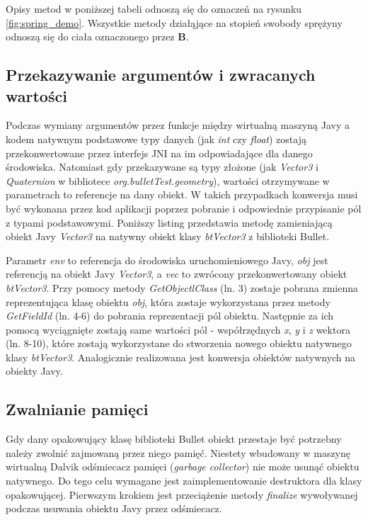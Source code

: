 Opisy metod w poniższej tabeli odnoszą się do oznaczeń na rysunku
\ref{fig:spring_demo}. Wszystkie metody działąjące na stopień swobody sprężyny
odnoszą się do ciała oznaczonego przez \textbf{B}.\\


\subsection{Przekazywanie argumentów i zwracanych wartości}
Podczas wymiany argumentów przez funkcje między wirtualną maszyną Javy a kodem
natywnym podstawowe typy danych (jak \emph{int} czy \emph{float}) zostają
przekonwertowane przez interfejs JNI na im odpowiadające dla danego środowiska.
Natomiast gdy przekazywane są typy złożone (jak \emph{Vector3} i
\emph{Quaternion} w bibliotece \emph{org.bulletTest.geometry}), wartości
otrzymywane w parametrach to referencje na dany obiekt. W takich przypadkach
konwersja musi być wykonana przez kod aplikacji poprzez pobranie i odpowiednie
przypisanie pól z typami podstawowymi. Poniższy listing przedstawia metodę
zamieniającą obiekt Javy \emph{Vector3} na natywny obiekt klasy \emph{btVector3}
z biblioteki Bullet.



Parametr \emph{env} to referencja do środowiska uruchomieniowego Javy,
\emph{obj} jest referencją na obiekt Javy \emph{Vector3}, a \emph{vec} to
zwrócony przekonwertowany obiekt \emph{btVector3}. Przy pomocy metody
\emph{GetObjectlClass} (ln. 3) zostaje pobrana zmienna reprezentująca klasę
obiektu \emph{obj}, która zostaje wykorzystana przez metody
\emph{GetFieldId} (ln. 4-6) do pobrania reprezentacji pól obiektu. Następnie za
ich pomocą wyciągnięte zostają same wartości pól - współrzędnych \emph{x},
\emph{y} i \emph{z} wektora (ln. 8-10), które zostają wykorzystane do stworzenia
nowego obiektu natywnego klasy \emph{btVector3}. Analogicznie realizowana jest
konwersja obiektów natywnych na obiekty Javy.

\subsection{Zwalnianie pamięci}
Gdy dany opakowujący klasę biblioteki Bullet obiekt przestaje być potrzebny
należy zwolnić zajmowaną przez niego pamięć. Niestety wbudowany w maszynę
wirtualną Dalvik odśmiecacz pamięci (\emph{garbage collector}) nie może usunąć
obiektu natywnego. Do tego celu wymagane jest zaimplementowanie destruktora dla
klasy opakowującej. Pierwszym krokiem jest przeciążenie metody \emph{finalize}
wywoływanej podczas usuwania obiektu Javy przez odśmiecacz.

